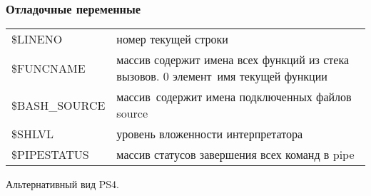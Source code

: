 \begin{frame}[fragile]
	\frametitle{Отладочные переменные}

  \begin{tabular}{ l  p{7cm} }
    \alert{\$LINENO}  & номер текущей строки \\ 
    \alert{\$FUNCNAME} & массив содержит имена всех функций из стека вызовов. 0 элемент\, имя текущей функции \\
    \alert{\$BASH\_SOURCE} & массив\, содержит имена подключенных файлов source\\
    \alert{\$SHLVL} & уровень вложенности интерпретатора \\
    \alert{\$PIPESTATUS} & массив статусов завершения всех команд в pipe \\
    \end{tabular}

	\begin{block}{Альтернативный вид PS4.}
         
	\end{block}
\end{frame}

